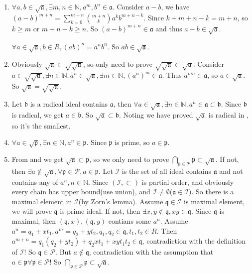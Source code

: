 \documentclass{ctexart}
\newcommand\<{\langle}
\renewcommand\>{\rangle}
\newcommand\N{\mathbb{N}}
\newcommand{\fra}{\mathfrak{a}}
\newcommand{\frb}{\mathfrak{b}}
\newcommand{\frp}{\mathfrak{p}}
\begin{document}
\begin{solution}
    \begin{enumerate}
        \item $\forall a,b\in\sqrt{\fra},\exists m,n\in\N,a^m,b^n\in \fra$. Consider $a-b$, we have $(a-b)^{m+n}=\sum_{k=0}^{m+n}\binom{m+n}{k}a^kb^{m+n-k}$. Since $k+m+n-k=m+n$, so $k\geq m$ or $m+n-k\geq n$. So $(a-b)^{m+n}\in\fra$ and thus $a-b\in\sqrt{\fra}$. 
        
        $\forall a\in\sqrt{\fra},b\in R,(ab)^n=a^nb^n$. So $ab\in\sqrt{\fra}$. 
        \item  Obviously $\sqrt{\fra}\subset\sqrt{\sqrt{\fra}}$, so only need to prove $\sqrt{\sqrt{\fra}}\subset \sqrt{\fra}$. Consider $a\in \sqrt{\sqrt{\fra}},\exists n\in\N,a^n\in\sqrt{\fra},\exists m\in\N,(a^n)^m\in\fra$. Thus $a^{mn}\in\fra$, so $a\in\sqrt{\fra}$. So $\sqrt{\fra}=\sqrt{\sqrt{\fra}}$. 
        \item Let $\frb$ is a radical ideal contains $\fra$, then $\forall a\in\sqrt{\fra},\exists n\in\N,a^n\in\fra\subset\frb$. 
        Since $\frb$ is radical, we get $a\in\frb$. So $\sqrt{\fra}\subset \frb$. 
        Noting we have proved $\sqrt{\fra}$ is radical in , so it's the smallest. 
        \item $\forall a\in\sqrt{\frp},\exists n\in\N,a^n\in\frp$. Since $\frp$ is prime, so $a\in\frp$. 
        \item From  and  we get $\sqrt{\fra}\subset \frp$, so we only need to prove $\bigcap_{\frp\in\mathcal{P}}\frp\subset \sqrt{\fra}$. If not, then $\exists a\notin \sqrt{\fra},\forall \frp\in\mathcal{P},a\in\frp$. Let $\mathcal{I}$ is the set of all ideal contains $\fra$ and not contains any of $a^n,n\in\N$. Since $(\mathcal{I},\subset)$ is partial order, and obviously every chain has upper bound(use union), and $\mathcal{I}\neq \emptyset$($\fra\in\mathcal{I})$. So there is a maximal element in $\mathcal{I}$(by Zorn's lemma). Assume $\mathfrak{q}\in \mathcal{I}$ is maximal element, we will prove $\mathfrak{q}$ is prime ideal. If not, then $\exists x,y\notin\mathfrak{q},xy\in \mathfrak{q}$. Since $\mathfrak{q}$ is maximal, then $(\mathfrak{q},x),(\mathfrak{q},y)$ contians some $a^n$. Assume $a^n=q_1+xt_1,a^m=q_2+yt_2,q_1,q_2\in \mathfrak{q},t_1,t_2\in R$. Then $a^{m+n}=q_1(q_2+yt_2)+q_2xt_1+xyt_1t_2\in \mathfrak{q}$, contradiction with the definition of $\mathcal{I}$! So $\mathfrak{q}\in\mathcal{P}$. But $a\notin \mathfrak{q}$, contradiction with the assumption that $a\in\frp\forall\frp\in\mathcal{P}$! So $\bigcap_{\frp\in\mathcal{P}}\frp\subset \sqrt{\fra}$. 
    \end{enumerate}
\end{solution}
\end{document}
